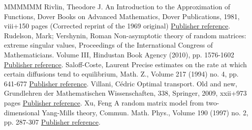 \documentclass[11pt]{article}
\theoremstyle{definition}
\numberwithin{equation}{section}
\numberwithin{figure}{section}
\numberwithin{table}{section}
\begin{document}
\begin{thebibliography}{MMMMMM}
 Rivlin, Theodore J. An Introduction to the Approximation of Functions, Dover Books on Advanced Mathematics, Dover Publications, 1981, viii+150 pages (Corrected reprint of the 1969 original) \href{https://ahl.centre-mersenne.org/item/AHL_2018__1__247_0/#Rivlin1981}{Publisher reference}.
 Rudelson, Mark; Vershynin, Roman Non-asymptotic theory of random matrices: extreme singular values, Proceedings of the International Congress of Mathematicians. Volume III, Hindustan Book Agency (2010), pp. 1576-1602 \href{https://ahl.centre-mersenne.org/item/AHL_2018__1__247_0/#RudVer10}{Publisher reference}.
 Saloff-Coste, Laurent Precise estimates on the rate at which certain diffusions tend to equilibrium, Math. Z., Volume 217 (1994) no. 4, pp. 641-677 \href{https://ahl.centre-mersenne.org/item/AHL_2018__1__247_0/#SC1994b}{Publisher reference}.
 Villani, Cédric Optimal transport. Old and new, Grundlehren der Mathematischen Wissenschaften, 338, Springer, 2009, xxii+973 pages \href{https://ahl.centre-mersenne.org/item/AHL_2018__1__247_0/#Vil}{Publisher reference}.
 Xu, Feng A random matrix model from two-dimensional Yang-Mills theory, Commun. Math. Phys., Volume 190 (1997) no. 2, pp. 287-307 \href{https://ahl.centre-mersenne.org/item/AHL_2018__1__247_0/#Xu1997}{Publisher reference}.
\end{thebibliography}
\end{document}
